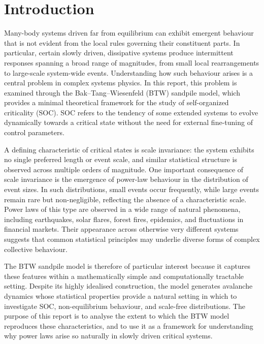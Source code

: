 \documentclass{article}
\begin{document}


\tableofcontents %

\clearpage

\section{Introduction}
Many-body systems driven far from equilibrium can exhibit emergent behaviour that is not evident from the local rules governing their constituent parts. In particular, certain slowly driven, dissipative systems produce intermittent responses spanning a broad range of magnitudes, from small local rearrangements to large-scale system-wide events. Understanding how such behaviour arises is a central problem in complex systems physics. In this report, this problem is examined through the Bak–Tang–Wiesenfeld (BTW) sandpile model, which provides a minimal theoretical framework for the study of self-organized criticality (SOC). SOC refers to the tendency of some extended systems to evolve dynamically towards a critical state without the need for external fine-tuning of control parameters.

\hspace{5mm}

A defining characteristic of critical states is scale invariance: the system exhibits no single preferred length or event scale, and similar statistical structure is observed across multiple orders of magnitude. One important consequence of scale invariance is the emergence of power-law behaviour in the distribution of event sizes. In such distributions, small events occur frequently, while large events remain rare but non-negligible, reflecting the absence of a characteristic scale. Power laws of this type are observed in a wide range of natural phenomena, including earthquakes, solar flares, forest fires, epidemics, and fluctuations in financial markets. Their appearance across otherwise very different systems suggests that common statistical principles may underlie diverse forms of complex collective behaviour.

\hspace{5mm}

The BTW sandpile model is therefore of particular interest because it captures these features within a mathematically simple and computationally tractable setting. Despite its highly idealised construction, the model generates avalanche dynamics whose statistical properties provide a natural setting in which to investigate SOC, non-equilibrium behaviour, and scale-free distributions. The purpose of this report is to analyse the extent to which the BTW model reproduces these characteristics, and to use it as a framework for understanding why power laws arise so naturally in slowly driven critical systems.
\end{document}
